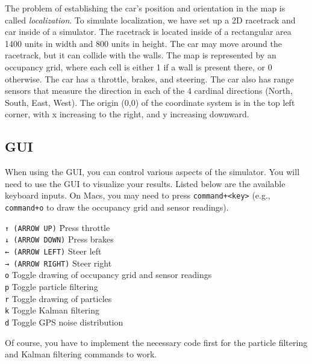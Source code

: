 \documentclass[a4paper]{article}
\theoremstyle{definition}
\theoremstyle{plain}
\begin{document}
The problem of establishing the car's position and orientation in the map is called \textit{localization}. To simulate localization, we have set up a 2D racetrack and car inside of a simulator. The racetrack is located inside of a rectangular area 1400 units in width and 800 units in height. The car may move around the racetrack, but it can collide with the walls. The map is represented by an occupancy grid, where each cell is either 1 if a wall is present there, or 0 otherwise. The car has a throttle, brakes, and steering. The car also has range sensors that measure the direction in each of the 4 cardinal directions (North, South, East, West). The origin (0,0) of the coordinate system is in the top left corner, with x increasing to the right, and y increasing downward.

\subsection*{GUI}

When using the GUI, you can control various aspects of the simulator. You will need to use the GUI to visualize your results. Listed below are the available keyboard inputs. On Macs, you may need to press \texttt{command+<key>} (e.g., \texttt{command+o} to draw the occupancy grid and sensor readings).

\begin{tabbing}
    \texttt{↑ (ARROW UP)} \hspace{2em} \= Press throttle \\
    \texttt{↓ (ARROW DOWN)} \> Press brakes\\
    \texttt{← (ARROW LEFT)} \> Steer left\\
    \texttt{→ (ARROW RIGHT)} \> Steer right\\
    \texttt{o} \> Toggle drawing of occupancy grid and sensor readings\\
    \texttt{p} \> Toggle particle filtering\\
    \texttt{r} \> Toggle drawing of particles\\
    \texttt{k} \> Toggle Kalman filtering\\
    \texttt{d} \> Toggle GPS noise distribution\\
\end{tabbing}

\noindent
Of course, you have to implement the necessary code first for the particle filtering and Kalman filtering commands to work.\\
\end{document}
